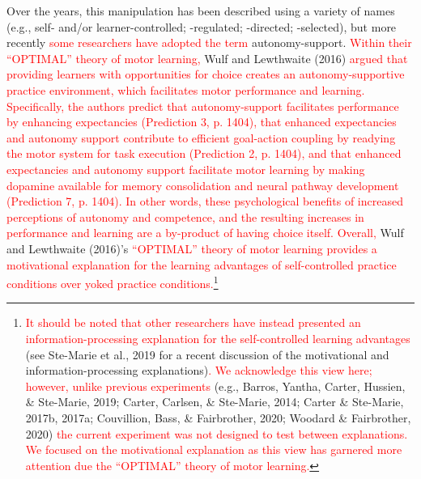 \documentclass[
  english,
  man, donotrepeattitle,floatsintext]{apa7}
\begin{document}
Over the years, this manipulation has been described using a variety of names (e.g., self- and/or learner-controlled; -regulated; -directed; -selected), but more recently \textcolor{red}{some researchers have adopted the term} autonomy-support. \textcolor{red}{Within their ``OPTIMAL'' theory of motor learning,} Wulf and Lewthwaite (2016) \textcolor{red}{argued that providing learners with opportunities for choice creates an autonomy-supportive practice environment, which facilitates motor performance and learning. Specifically, the authors predict that autonomy-support facilitates performance by enhancing expectancies (Prediction 3, p. 1404), that enhanced expectancies and autonomy support contribute to efficient goal-action coupling by readying the motor system for task execution (Prediction 2, p. 1404), and that enhanced expectancies and autonomy support facilitate motor learning by making dopamine available for memory consolidation and neural pathway development (Prediction 7, p. 1404). In other words, these psychological benefits of increased perceptions of autonomy and competence, and the resulting increases in performance and learning are a by-product of having choice itself. Overall,} Wulf and Lewthwaite (2016)'s \textcolor{red}{``OPTIMAL'' theory of motor learning provides a motivational explanation for the learning advantages of self-controlled practice conditions over yoked practice conditions.}\footnote{\textcolor{red}{It should be noted that other researchers have instead presented an information-processing explanation for the self-controlled learning advantages} (see Ste-Marie et al., 2019 for a recent discussion of the motivational and information-processing explanations)\textcolor{red}{. We acknowledge this view here; however, unlike previous experiments} (e.g., Barros, Yantha, Carter, Hussien, \& Ste-Marie, 2019; Carter, Carlsen, \& Ste-Marie, 2014; Carter \& Ste-Marie, 2017b, 2017a; Couvillion, Bass, \& Fairbrother, 2020; Woodard \& Fairbrother, 2020) \textcolor{red}{the current experiment was not designed to test between explanations. We focused on the motivational explanation as this view has garnered more attention due the ``OPTIMAL'' theory of motor learning.}}
\end{document}
